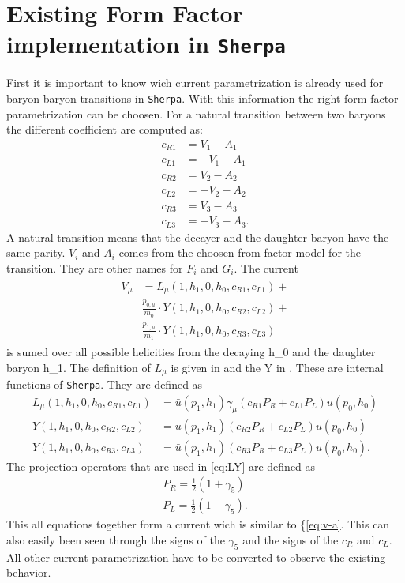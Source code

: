 \section{Existing Form Factor implementation in \texttt{Sherpa}}
First it is important to know wich current parametrization is already used 
for baryon baryon transitions in \texttt{Sherpa}. With this information 
the right form factor parametrization can be choosen.
For a natural transition between two baryons the different coefficient 
are computed as:
\begin{align}
  c_{R1} & = V_1 - A_1 \nonumber \\
  c_{L1} & = -V_1 - A_1 \nonumber \\
  c_{R2} & = V_2 - A_2 \nonumber \\
  c_{L2} & = -V_2 - A_2 \nonumber \\
  c_{R3} & = V_3 - A_3 \nonumber \\
  c_{L3} & = -V_3 - A_3. \label{eq:c-coeff}
\end{align}
A natural transition means that the decayer and the daughter baryon have the same parity.
\(V_i\) and \(A_i\) comes from the choosen from factor model for the transition. 
They are other names for \(F_i\) and \(G_i\).
The current 
\begin{align}
\begin{split}
  V_\mu &= L_\mu(1, h_1, 0, h_0, c_{R1}, c_{L1}) + \\
        & \frac{p_{0, \mu}}{m_0} \cdot Y(1, h_1, 0, h_0, c_{R2}, c_{L2}) + \\
        & \frac{p_{1, \mu}}{m_1} \cdot Y(1, h_1, 0, h_0, c_{R3}, c_{L3}) \label{eq:b-curr}
\end{split}
\end{align}
is sumed over all possible helicities from the decaying h\_0 and the daughter baryon h\_1.
The definition of \(L_\mu\) is given in \cite[Eq. A.96]{diploma} and the Y in 
\cite[Eq. A.94]{diploma}. These are internal functions of \texttt{Sherpa}. 
They are defined as
\begin{align}
  L_\mu(1, h_1, 0, h_0, c_{R1}, c_{L1}) & = \bar{u}(p_1, h_1)\gamma_\mu \left( c_{R1} P_R + c_{L1} P_L \right) u(p_0, h_0) \nonumber \\
  Y(1, h_1, 0, h_0, c_{R2}, c_{L2}) & = \bar{u}(p_1, h_1) \left( c_{R2} P_R + c_{L2} P_L \right) u(p_0, h_0) \nonumber \\
  Y(1, h_1, 0, h_0, c_{R3}, c_{L3}) & = \bar{u}(p_1, h_1) \left( c_{R3} P_R + c_{L3} P_L \right) u(p_0, h_0). \label{eq:LY}
\end{align}
The projection operators that are used in {\eqref{eq:LY}} are defined as
\begin{align}
  P_R = \frac{1}{2} \left( 1 + \gamma_5 \right) \nonumber \\
  P_L = \frac{1}{2} \left( 1 - \gamma_5 \right). \label{eq:proj}
\end{align}
This all equations together form a current wich is similar to {\{\eqref{eq:v-a}}.
This can also easily been seen through the signs of the \(\gamma_5\) and the 
signs of the \(c_R\) and \(c_L\).
All other current parametrization have to be converted to observe the 
existing behavior.


